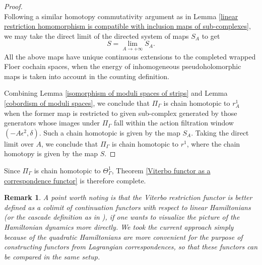 \documentclass{amsart}
\newtheorem{remark}[theorem]{Remark}
\numberwithin{equation}{section}
\numberwithin{figure}{section}
\begin{document}
\begin{proof}
\begin{equation*}
\end{equation*}
Following a similar homotopy commutativity argument as in Lemma \ref{linear restriction homomorphism is compatible with inclusion maps of sub-complexes}, we may take the direct limit of the directed system of maps $S_{A}$ to get
\begin{equation*}
S = \lim\limits_{A \to +\infty} S_{A}.
\end{equation*}
All the above maps have unique continuous extensions to the completed wrapped Floer cochain spaces, when the energy of inhomogeneous pseudoholomorphic maps is taken into account in the counting definition. \par
	Combining Lemma \ref{isomorphism of moduli spaces of strips} and Lemma \ref{cobordism of moduli spaces}, we conclude that $\Pi_{\Gamma}$ is chain homotopic to $r^{1}_{A}$ when the former map is restricted to given sub-complex generated by those generators whose images under $\Pi_{\Gamma}$ fall within the action filtration window $(-A\epsilon^{2}, \delta)$. Such a chain homotopic is given by the map $S_{A}$. Taking the direct limit over $A$, we conclude that $\Pi_{\Gamma}$ is chain homotopic to $r^{1}$, where the chain homotopy is given by the map $S$. \par
\end{proof}

	Since $\Pi_{\Gamma}$ is chain homotopic to $\Theta_{\Gamma}^{1}$, Theorem \ref{Viterbo functor as a correspondence functor} is therefore complete. \par

\begin{remark}
	A point worth noting is that the Viterbo restriction functor is better defined as a colimit of continuation functors with respect to linear Hamiltonians (or the cascade definition as in \cite{Abouzaid-Seidel}), if one wants to visualize the picture of the Hamiltonian dynamics more directly. We took the current approach simply because of the quadratic Hamiltonians are more convenient for the purpose of constructing functors from Lagrangian correspondences, so that these functors can be compared in the same setup.
\end{remark}
\end{document}
